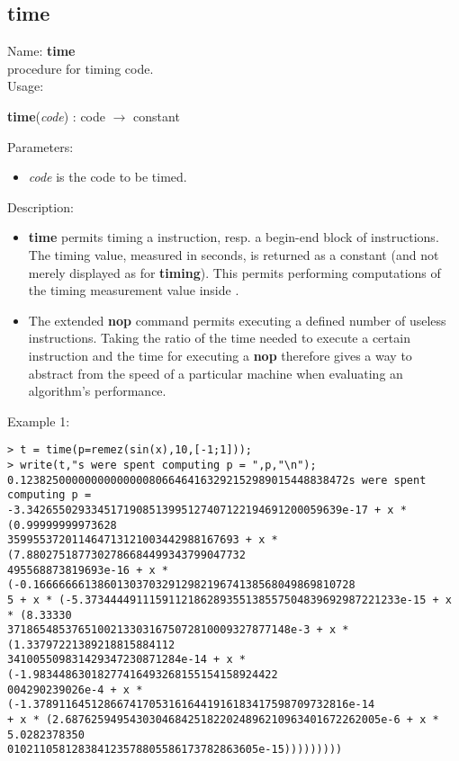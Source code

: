 \subsection{time}
\label{labtime}
\noindent Name: \textbf{time}\\
procedure for timing \sollya code.\\
\noindent Usage: 
\begin{center}
\textbf{time}(\emph{code}) : \textsf{code} $\rightarrow$ \textsf{constant}\\
\end{center}
Parameters: 
\begin{itemize}
\item \emph{code} is the code to be timed.
\end{itemize}
\noindent Description: \begin{itemize}

\item \textbf{time} permits timing a \sollya instruction, resp. a begin-end block
   of \sollya instructions. The timing value, measured in seconds, is returned
   as a \sollya constant (and not merely displayed as for \textbf{timing}). This 
   permits performing computations of the timing measurement value inside \sollya.

\item The extended \textbf{nop} command permits executing a defined number of
   useless instructions. Taking the ratio of the time needed to execute a
   certain \sollya instruction and the time for executing a \textbf{nop}
   therefore gives a way to abstract from the speed of a particular 
   machine when evaluating an algorithm's performance.
\end{itemize}
\noindent Example 1: 
\begin{center}\begin{minipage}{15cm}\begin{Verbatim}[frame=single]
> t = time(p=remez(sin(x),10,[-1;1]));
> write(t,"s were spent computing p = ",p,"\n");
0.123825000000000000008066464163292152989015448838472s were spent computing p = 
-3.3426550293345171908513995127407122194691200059639e-17 + x * (0.99999999973628
359955372011464713121003442988167693 + x * (7.8802751877302786684499343799047732
495568873819693e-16 + x * (-0.16666666138601303703291298219674138568049869810728
5 + x * (-5.3734444911159112186289355138557504839692987221233e-15 + x * (8.33330
37186548537651002133031675072810009327877148e-3 + x * (1.33797221389218815884112
341005509831429347230871284e-14 + x * (-1.98344863018277416493268155154158924422
004290239026e-4 + x * (-1.3789116451286674170531616441916183417598709732816e-14 
+ x * (2.6876259495430304684251822024896210963401672262005e-6 + x * 5.0282378350
010211058128384123578805586173782863605e-15)))))))))
\end{Verbatim}
\end{minipage}\end{center}
